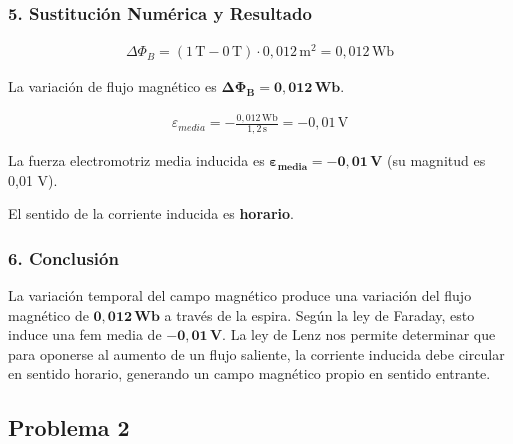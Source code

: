 \subsubsection*{5. Sustitución Numérica y Resultado}
\begin{gather}
    \Delta\Phi_B = (1\,\text{T} - 0\,\text{T}) \cdot 0,012\,\text{m}^2 = 0,012\,\text{Wb}
\end{gather}
\begin{cajaresultado}
    La variación de flujo magnético es $\boldsymbol{\Delta\Phi_B = 0,012\,\textbf{Wb}}$.
\end{cajaresultado}
\begin{gather}
    \varepsilon_{media} = -\frac{0,012\,\text{Wb}}{1,2\,\text{s}} = -0,01\,\text{V}
\end{gather}
\begin{cajaresultado}
    La fuerza electromotriz media inducida es $\boldsymbol{\varepsilon_{media} = -0,01\,\textbf{V}}$ (su magnitud es 0,01 V).
\end{cajaresultado}
\begin{cajaresultado}
    El sentido de la corriente inducida es \textbf{horario}.
\end{cajaresultado}

\subsubsection*{6. Conclusión}
\begin{cajaconclusion}
La variación temporal del campo magnético produce una variación del flujo magnético de $\mathbf{0,012\,Wb}$ a través de la espira. Según la ley de Faraday, esto induce una fem media de $\mathbf{-0,01\,V}$. La ley de Lenz nos permite determinar que para oponerse al aumento de un flujo saliente, la corriente inducida debe circular en sentido horario, generando un campo magnético propio en sentido entrante.
\end{cajaconclusion}

\newpage

\subsection{Problema 2}
\label{subsec:P2_2020_sep_ext}

